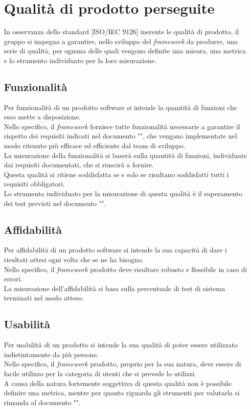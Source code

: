 
\section{Qualità di prodotto perseguite}
	In osservanza dello standard [ISO/IEC 9126] inerente le qualità di prodotto, il gruppo \groupname{} si impegna a garantire, nello sviluppo del \textit{framework} da produrre, una serie di qualità, per ognuna delle quali vengono definite una misura, una metrica e lo strumento individuato per la loro misurazione.
	\subsection{Funzionalità}
		Per funzionalità di un prodotto software si intende la quantità di funzioni che esso mette a disposizione.\\
		Nello specifico, il \textit{framework} fornisce tutte funzionalità necessarie a garantire il rispetto dei requisiti indicati nel documento "", che vengono implementate nel modo ritenuto più efficace ed efficiente dal team di sviluppo.\\
		La misurazione della funzionalità si baserà sulla quantità di funzioni, individuate dai requisiti documentati, che si riuscirà a fornire.\\
		Questa qualità si ritiene soddisfatta se e solo se risultano soddisfatti tutti i requisiti obbligatori.\\
		Lo strumento individuato per la misurazione di questa qualità è il superamento dei test previsti nel documento "".
	\subsection{Affidabilità}
		Per affidabilità di un prodotto software si intende la sua capacità di dare i risultati attesi ogni volta che se ne ha bisogno.\\
		Nello specifico, il \textit{framework} prodotto deve risultare robusto e flessibile in caso di errori.\\
		La misurazione dell'affidabilità si basa sulla percentuale di test di sistema terminati nel modo atteso.
	\subsection{Usabilità}
		Per usabilità di un prodotto si intende la sua qualità di poter essere utilizzato indistintamente da più persone.\\
		Nello specifico, il \textit{framework} prodotto, proprio per la sua natura, deve essere di facile utilizzo per la categoria di utenti che si prevede lo utilizzi.\\
		A causa della natura fortemente soggettiva di questa qualità non è possibile definire una metrica, mentre per quanto riguarda gli strumenti per valutarla si rimanda al documento "".
